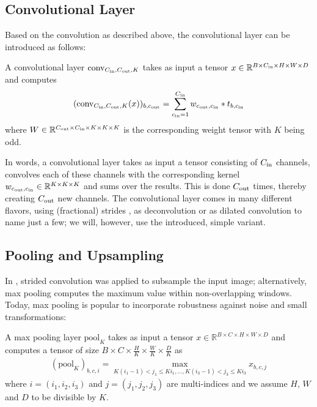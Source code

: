 \subsection{Convolutional Layer}

Based on the convolution as described above, the convolutional layer can
be introduced as follows:

\begin{definition}
  A convolutional layer $\text{conv}_{C_{\text{in}}, C_{\text{out}}, K}$ takes as input a tensor
  $x \in \mathbb{R}^{B \times C_{\text{in}} \times H \times W \times D}$ and computes
  \begin{align}
    (\text{conv}_{C_{\text{in}}, C_{\text{out}}, K}(x))_{b, c_{\text{out}}} = \sum_{c_{\text{in}} = 1}^{C_{\text{in}}} w_{c_{\text{out}}, c_{\text{in}}} \ast t_{b, c_{\text{in}}}
  \end{align}
  where $W \in \mathbb{R}^{C_{\text{out}} \times C_{\text{in}} \times K \times K \times K}$ is the
  corresponding weight tensor with $K$ being odd.
\end{definition}

In words, a convolutional layer takes as input a tensor consisting of
$C_{\text{in}}$ channels, convolves each of these channels with
the corresponding kernel $w_{c_{\text{out}}, c_{\text{in}}} \in \mathbb{R}^{K \times K \times K}$
and sums over the results. This
is done $C_{\text{out}}$ times, thereby creating $C_{\text{out}}$ new channels.
The convolutional layer comes in many different flavors, \eg using 
(fractional) strides \cite{DumoulinVisin:2016}, as deconvolution 
\cite{ZeilerFergus:2010} or as dilated convolution \cite{YuKoltun:2015}
to name just a few; we will, however, use the introduced, simple variant.

\subsection{Pooling and Upsampling}

In \cite{LeCunBoserDenkerHenderson:1989}, strided
convolution was applied to subsample the input image; alternatively, max pooling
\cite{ZhouChellappa:1988} computes the maximum value within non-overlapping windows.
Today, max pooling is popular to incorporate robustness against noise and
small transformations:

\begin{definition}
  A max pooling layer $\text{pool}_{K}$ takes as input a tensor
  $x \in \mathbb{R}^{B \times C \times H \times W \times D}$
  and computes a tensor of size $B \times C \times \frac{H}{K} \times \frac{W}{K} \times \frac{D}{K}$ as
  \begin{align}
    (\text{pool}_{K})_{b, c, i} = \max_{K(i_1 - 1) < j_1 \leq K i_1, \ldots, K (i_3 - 1) < j_3 \leq K i_3} x_{b, c, j}%
  \end{align}
  where $i = (i_1, i_2, i_3)$ and $j = (j_1, j_2, j_3)$ are multi-indices and
  we assume $H$, $W$ and $D$ to be divisible by $K$.
\end{definition}

